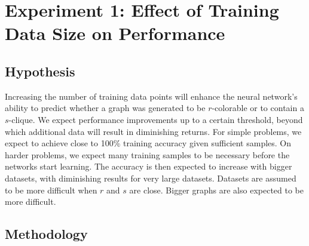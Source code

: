 \section{Experiment 1: Effect of Training Data Size on Performance}

\subsection{Hypothesis}

Increasing the number of training data points will enhance the neural network's ability to predict whether a graph was generated to be $r$-colorable or to contain a $s$-clique. We expect performance improvements up to a certain threshold, beyond which additional data will result in diminishing returns. For simple problems, we expect to achieve close to 100\% training accuracy given sufficient samples. On harder problems, we expect many training samples to be necessary before the networks start learning. The accuracy is then expected to increase with bigger datasets, with diminishing results for very large datasets. Datasets are assumed to be more difficult when $r$ and $s$ are close. Bigger graphs are also expected to be more difficult.

\subsection{Methodology}


